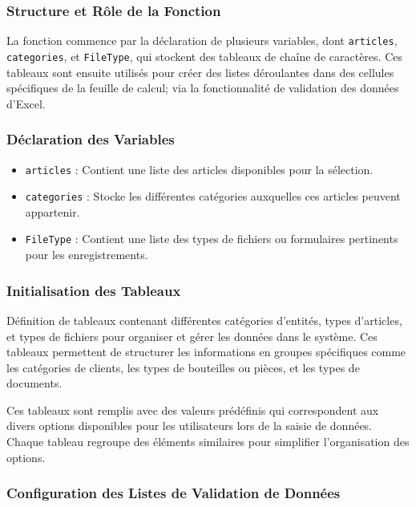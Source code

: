 \documentclass[a4paper, oneside, 12pt, final]{extreport}
\begin{document}
\subsubsection{Structure et Rôle de la Fonction}

La fonction commence par la déclaration de plusieurs variables, dont \texttt{articles}, \texttt{categories}, et \texttt{FileType}, qui stockent des tableaux de chaîne de caractères. Ces tableaux sont ensuite utilisés pour créer des listes déroulantes dans des cellules spécifiques de la feuille de calcul; via la fonctionnalité de validation des données d'Excel.

\subsubsection{Déclaration des Variables}



\begin{itemize}
    \item \texttt{articles} : Contient une liste des articles disponibles pour la sélection.
    \item \texttt{categories} : Stocke les différentes catégories auxquelles ces articles peuvent appartenir.
    \item \texttt{FileType} : Contient une liste des types de fichiers ou formulaires pertinents pour les enregistrements.
\end{itemize}

\subsubsection{Initialisation des Tableaux}

Définition de tableaux contenant différentes catégories d'entités, types d'articles, et types de fichiers pour organiser et gérer les données dans le système. Ces tableaux permettent de structurer les informations en groupes spécifiques comme les catégories de clients, les types de bouteilles ou pièces, et les types de documents.

Ces tableaux sont remplis avec des valeurs prédéfinis qui correspondent aux divers options disponibles pour les utilisateurs lors de la saisie de données. Chaque tableau regroupe des éléments similaires pour simplifier l'organisation des options.

\subsubsection{Configuration des Listes de Validation de Données}
\end{document}
